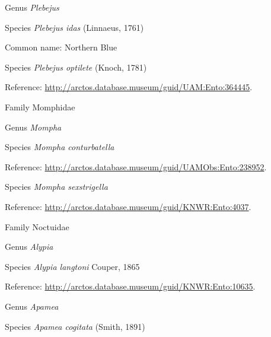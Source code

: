 \documentclass[9pt, article]{memoir}
\begin{document}
\begin{multicols}{2}
\vspace{6pt}\noindent\hspace{30pt}Genus \textit{Plebejus}


\vspace{6pt}\noindent\hspace{36pt}Species \textit{Plebejus idas} (Linnaeus, 1761)


Common name: Northern Blue

\vspace{6pt}\noindent\hspace{36pt}Species \textit{Plebejus optilete} (Knoch, 1781)


Reference: 
\url{http://arctos.database.museum/guid/UAM:Ento:364445}.

\vspace{6pt}\noindent\hspace{24pt}Family Momphidae


\vspace{6pt}\noindent\hspace{30pt}Genus \textit{Mompha}


\vspace{6pt}\noindent\hspace{36pt}Species \textit{Mompha conturbatella}


Reference: 
\url{http://arctos.database.museum/guid/UAMObs:Ento:238952}.

\vspace{6pt}\noindent\hspace{36pt}Species \textit{Mompha sexstrigella}


Reference: 
\url{http://arctos.database.museum/guid/KNWR:Ento:4037}.

\vspace{6pt}\noindent\hspace{24pt}Family Noctuidae


\vspace{6pt}\noindent\hspace{30pt}Genus \textit{Alypia}


\vspace{6pt}\noindent\hspace{36pt}Species \textit{Alypia langtoni} Couper, 1865


Reference: 
\url{http://arctos.database.museum/guid/KNWR:Ento:10635}.

\vspace{6pt}\noindent\hspace{30pt}Genus \textit{Apamea}


\vspace{6pt}\noindent\hspace{36pt}Species \textit{Apamea cogitata} (Smith, 1891)



\end{multicols}
\end{document}
